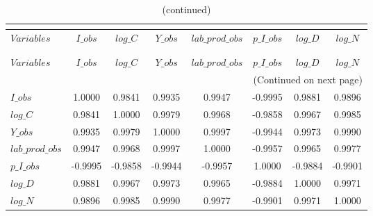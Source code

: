  
\begin{center}
\begin{longtable}{lccccccc} 
\caption{MATRIX OF CORRELATIONS}\\
 \label{Table:th_corr_matrix}\\
\toprule 
$Variables       $	 & 	 $           I\_obs$	 & 	 $           log\_C$	 & 	 $           Y\_obs$	 & 	 $  lab\_prod\_obs$	 & 	 $       p\_I\_obs$	 & 	 $           log\_D$	 & 	 $           log\_N$\\
\midrule \endfirsthead 
\caption{(continued)}\\
 \toprule \\ 
$Variables       $	 & 	 $           I\_obs$	 & 	 $           log\_C$	 & 	 $           Y\_obs$	 & 	 $  lab\_prod\_obs$	 & 	 $       p\_I\_obs$	 & 	 $           log\_D$	 & 	 $           log\_N$\\
\midrule \endhead 
\midrule \multicolumn{8}{r}{(Continued on next page)} \\ \bottomrule \endfoot 
\bottomrule \endlastfoot 
$I\_obs          $	 & 	            1.0000	 & 	            0.9841	 & 	            0.9935	 & 	            0.9947	 & 	           -0.9995	 & 	            0.9881	 & 	            0.9896 \\ 
$log\_C          $	 & 	            0.9841	 & 	            1.0000	 & 	            0.9979	 & 	            0.9968	 & 	           -0.9858	 & 	            0.9967	 & 	            0.9985 \\ 
$Y\_obs          $	 & 	            0.9935	 & 	            0.9979	 & 	            1.0000	 & 	            0.9997	 & 	           -0.9944	 & 	            0.9973	 & 	            0.9990 \\ 
$lab\_prod\_obs  $	 & 	            0.9947	 & 	            0.9968	 & 	            0.9997	 & 	            1.0000	 & 	           -0.9957	 & 	            0.9965	 & 	            0.9977 \\ 
$p\_I\_obs       $	 & 	           -0.9995	 & 	           -0.9858	 & 	           -0.9944	 & 	           -0.9957	 & 	            1.0000	 & 	           -0.9884	 & 	           -0.9901 \\ 
$log\_D          $	 & 	            0.9881	 & 	            0.9967	 & 	            0.9973	 & 	            0.9965	 & 	           -0.9884	 & 	            1.0000	 & 	            0.9971 \\ 
$log\_N          $	 & 	            0.9896	 & 	            0.9985	 & 	            0.9990	 & 	            0.9977	 & 	           -0.9901	 & 	            0.9971	 & 	            1.0000 \\ 
\end{longtable}
 \end{center}
